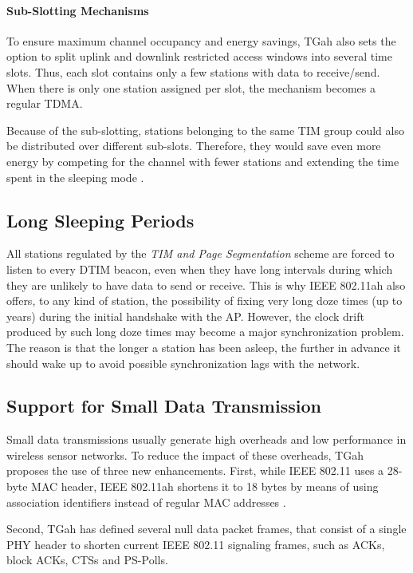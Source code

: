 \documentclass[]{article}
\begin{document}
\paragraph{Sub-Slotting Mechanisms}
To ensure maximum channel occupancy and energy savings, TGah also sets the option to split uplink and downlink restricted access windows into several time slots. Thus, each slot contains only a few stations with data to receive/send. When there is only one station assigned per slot, the mechanism becomes a regular TDMA.

Because of the sub-slotting, stations belonging to the same TIM group could also be distributed over different sub-slots. Therefore, they would save even more energy by competing for the channel with fewer stations and extending the time spent in the sleeping mode \cite{EW_subm}. 

\subsection{Long Sleeping Periods}

All stations regulated by the \textit{TIM and Page Segmentation} scheme are forced to listen to every DTIM beacon, even when they have long intervals during which they are unlikely to have data to send or receive. This is why IEEE 802.11ah also offers, to any kind of station, the possibility of fixing very long doze times (up to years) during the initial handshake with the AP. However, the clock drift produced by such long doze times may become a major synchronization problem. The reason is that the longer a station has been asleep, the further in advance it should wake up to avoid possible synchronization lags with the network.

\subsection{Support for Small Data Transmission}

Small data transmissions usually generate high overheads and low performance in wireless sensor networks. To reduce the impact of these overheads, TGah proposes the use of three new enhancements. First, while IEEE 802.11 uses a 28-byte MAC header, IEEE 802.11ah shortens it to 18 bytes by means of using association identifiers instead of regular MAC addresses \cite{zhou2013}. 

Second, TGah has defined several null data packet frames, that consist of a single PHY header to shorten current IEEE 802.11 signaling frames, such as ACKs, block ACKs, CTSs and PS-Polls. 
\end{document}
